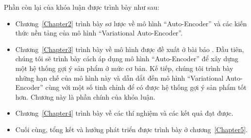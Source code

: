 


Phần còn lại của khóa luận được trình bày như sau:
\begin{itemize}
    \item Chương~\ref{Chapter2} trình bày sơ lược về mô hình ``Auto-Encoder'' và các kiến thức nền tảng của mô hình ``Variational Auto-Encoder''.
    \item Chương~\ref{Chapter3} trình bày về mô hình được đề xuất ở bài báo \cite{mvae}. Đầu tiên, chúng tôi sẽ trình bày cách áp dụng mô hình ``Auto-Encoder'' để xây dựng một hệ thống gợi ý sản phẩm ở mức cơ bản. Kế tiếp, chúng tôi trình bày những hạn chế của mô hình này và dẫn dắt đến mô hình ``Variational Auto-Encoder'' cùng với một số tinh chỉnh để có được hệ thống gợi ý sản phẩm tốt hơn. Chương này là phần chính của khóa luận.  
    \item Chương~\ref{Chapter4} trình bày về các thí nghiệm và các kết quả đạt được.
    \item Cuối cùng, tổng kết và hướng phát triển được trình bày ở chương~\ref{Chapter5}.
\end{itemize}

